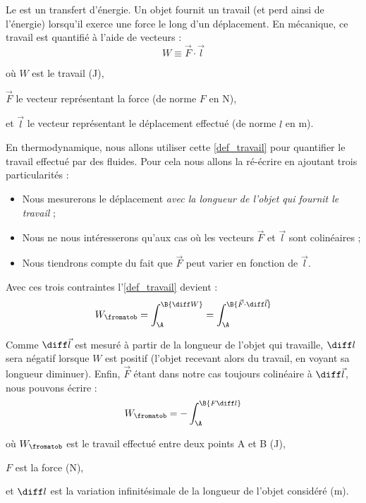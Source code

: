 	Le  est un transfert d’énergie. Un objet fournit un travail (et perd ainsi de l’énergie) lorsqu’il exerce une force le long d’un déplacement. En mécanique, ce travail est quantifié à l’aide de vecteurs :
	\begin{equation}
		W \equiv \vec F \cdot \vec l
		\label{def_travail}
	\end{equation}
	\begin{equationterms}		
		\item où \tab $W$ 		\tab est le travail (\si{\joule}),
		\item 	\tab $\vec F$ 	\tab le vecteur représentant la force (de norme $F$ en \si{\newton}),
		\item et \tab $\vec l$ 	\tab le vecteur représentant le déplacement effectué (de norme $l$ en \si{\metre}).
	\end{equationterms}

	En thermodynamique, nous allons utiliser cette \cref{def_travail} pour quantifier le travail effectué par des fluides. Pour cela nous allons la ré-écrire en ajoutant trois particularités :
	
	\begin{itemize}
		\item Nous mesurerons le déplacement \emph{avec la longueur de l’objet qui fournit le travail} ;
		\item Nous ne nous intéresserons qu’aux cas où les vecteurs $\vec F$ et $\vec l$ sont colinéaires ;
		\item Nous tiendrons compte du fait que $\vec F$ peut varier en fonction de $\vec l$.
	\end{itemize}


	Avec ces trois contraintes l’\cref{def_travail} devient :
		\begin{equation*}
		W_\fromatob = \int_\A^\B {\diff W} = \int_\A^\B {\vec F \cdot \diff \vec l}
		\end{equation*}

	Comme $\diff \vec l$ est mesuré à partir de la longueur de l’objet qui travaille, $\diff l$ sera négatif lorsque $W$ est positif (l’objet recevant alors du travail, en voyant sa longueur diminuer). Enfin, $\vec F$ étant dans notre cas toujours colinéaire à $\diff \vec l$, nous pouvons écrire :
		\begin{equation}
		W_\fromatob = -\int_\A^\B {F \diff l}
		\label{eq_travail_fdl}
		\end{equation}
	\begin{equationterms}		
		\item où \tab $W_\fromatob$ 	\tab est le travail effectué entre deux points A et B (\si{\joule}),
		\item 	\tab $F$ 				\tab est la force (\si{\newton}),
		\item et \tab $\diff l$ 		\tab est la variation infinitésimale de la longueur de l’objet considéré (\si{\metre}).
	\end{equationterms}

